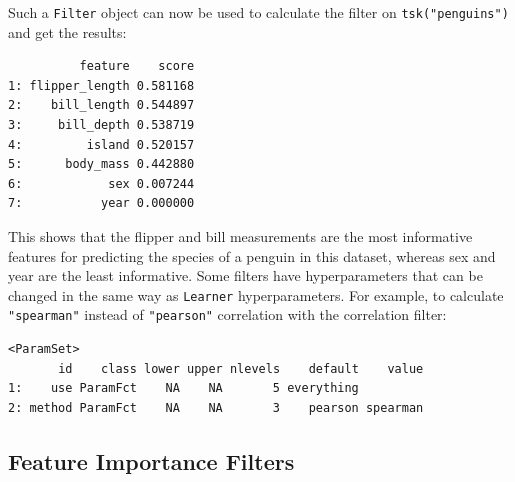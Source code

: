 Such a \texttt{Filter} object can now be used to calculate the filter on
\texttt{tsk("penguins")} and get the results:

\begin{Shaded}
\begin{Highlighting}[]
\OtherTok{=} \NormalTok{(}\NormalTok{)}
\SpecialCharTok{$}

\end{Highlighting}
\end{Shaded}

\begin{verbatim}
          feature    score
1: flipper_length 0.581168
2:    bill_length 0.544897
3:     bill_depth 0.538719
4:         island 0.520157
5:      body_mass 0.442880
6:            sex 0.007244
7:           year 0.000000
\end{verbatim}

This shows that the flipper and bill measurements are the most
informative features for predicting the species of a penguin in this
dataset, whereas sex and year are the least informative. Some filters
have hyperparameters that can be changed in the same way as
\texttt{Learner} hyperparameters. For example, to calculate
\texttt{"spearman"} instead of \texttt{"pearson"} correlation with the
correlation filter:

\begin{Shaded}
\begin{Highlighting}[]
\OtherTok{=} \NormalTok{(}\NormalTok{, } \NormalTok{)}
\SpecialCharTok{$}
\end{Highlighting}
\end{Shaded}

\begin{verbatim}
<ParamSet>
       id    class lower upper nlevels    default    value
1:    use ParamFct    NA    NA       5 everything         
2: method ParamFct    NA    NA       3    pearson spearman
\end{verbatim}

\hypertarget{sec-fs-var-imp-filters}{%
\subsection{Feature Importance Filters}\label{sec-fs-var-imp-filters}}

